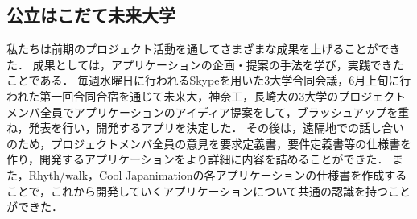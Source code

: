 \subsection{公立はこだて未来大学}
\par
私たちは前期のプロジェクト活動を通してさまざまな成果を上げることができた．
成果としては，アプリケーションの企画・提案の手法を学び，実践できたことである．
毎週水曜日に行われるSkypeを用いた3大学合同会議，6月上旬に行われた第一回合同合宿を通じて未来大，神奈工，長崎大の3大学のプロジェクトメンバ全員でアプリケーションのアイディア提案をして，ブラッシュアップを重ね，発表を行い，開発するアプリを決定した．
その後は，遠隔地での話し合いのため，プロジェクトメンバ全員の意見を要求定義書，要件定義書等の仕様書を作り，開発するアプリケーションをより詳細に内容を詰めることができた．
また，Rhyth/walk，Cool Japanimationの各アプリケーションの仕様書を作成することで，これから開発していくアプリケーションについて共通の認識を持つことができた．
